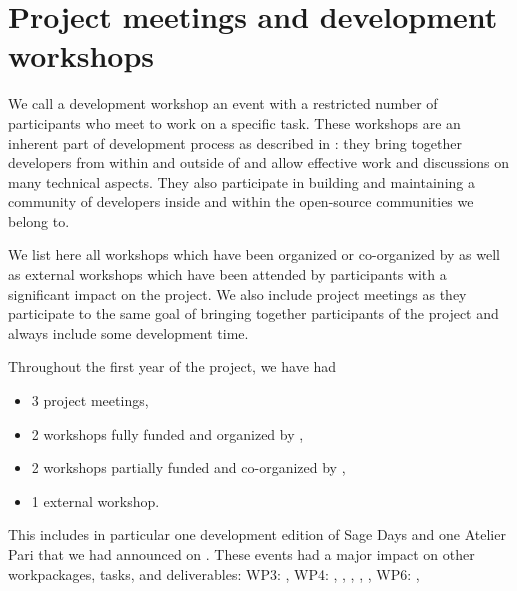 \documentclass{deliverablereport}
\author{Viviane Pons et al.}
\begin{document}
\enlargethispage{4ex}
\maketitle
\githubissuedescription
\tableofcontents
\newpage


\section{Project meetings and development workshops}

We call a development workshop an event with a restricted number of participants
who meet to work on a specific task. These workshops are an inherent part
of \ODK development process as described in :
 they bring together
developers from within and outside of \ODK and allow effective work
and discussions on many technical aspects. They also participate in building
and maintaining a community of developers inside \ODK and within the
open-source communities we belong to.

We list here all workshops which have been organized or co-organized by \ODK
as well as external workshops which have been attended by \ODK participants
with a significant impact on the project. We also include project meetings as they
participate to the same goal of bringing together participants of the project and
always include some development time.

Throughout the first year of the project, we have had
\begin{itemize}
\item 3 project meetings,
\item 2 workshops fully funded and organized by \ODK,
\item 2 workshops partially funded and co-organized by \ODK,
\item 1 external workshop.
\end{itemize}
This includes in particular one development edition of Sage Days and one Atelier
Pari that we had announced on .
 These events had a major impact on other \ODK workpackages, tasks, and deliverables: WP3:
,
WP4:
,
,
,
,
,
WP6:
,
\end{document}
